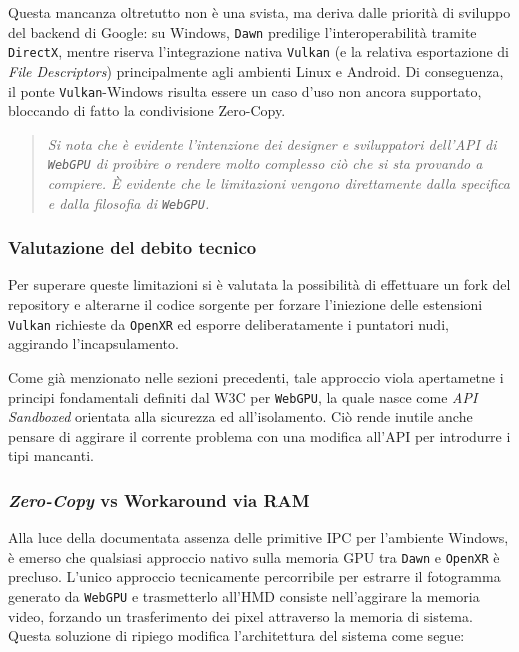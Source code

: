 \documentclass[a4paper, 11pt, twoside]{report}
\begin{document}
Questa mancanza oltretutto non è una svista, ma deriva dalle priorità di sviluppo del backend di Google:
su Windows, \texttt{Dawn} predilige l'interoperabilità tramite \texttt{\gls{DirectX}}, mentre riserva l'integrazione
nativa \texttt{\gls{Vulkan}} (e la relativa esportazione di \textit{File Descriptors}) principalmente agli ambienti
Linux e Android. Di conseguenza, il ponte \texttt{\gls{Vulkan}}-Windows risulta essere un caso d'uso non ancora
supportato, bloccando di fatto la condivisione Zero-Copy.

\begin{quote}
\itshape
Si nota che è evidente l'intenzione dei designer e sviluppatori dell'API di \texttt{WebGPU} di proibire o rendere molto
complesso ciò che si sta provando a compiere. È evidente che le limitazioni vengono direttamente dalla specifica e dalla
filosofia di \texttt{WebGPU}.
\end{quote}

\subsubsection{Valutazione del debito tecnico}

Per superare queste limitazioni si è valutata la possibilità di effettuare un fork del repository e alterarne il codice
sorgente per forzare l'iniezione delle estensioni \texttt{\gls{Vulkan}} richieste da \texttt{\gls{OpenXR}} ed esporre
deliberatamente i puntatori nudi, aggirando l'incapsulamento.

Come già menzionato nelle sezioni precedenti, tale approccio viola apertametne i principi fondamentali definiti dal W3C
per \texttt{WebGPU}, la quale nasce come \textit{API Sandboxed} orientata alla sicurezza ed all'isolamento.
Ciò rende inutile anche pensare di aggirare il corrente problema con una modifica all'API per introdurre i tipi mancanti.

\subsubsection{\textit{Zero-Copy} vs Workaround via RAM}

Alla luce della documentata assenza delle primitive IPC per l'ambiente Windows, è emerso che qualsiasi approccio nativo
sulla memoria GPU tra \texttt{Dawn} e \texttt{\gls{OpenXR}} è precluso. L'unico approccio tecnicamente percorribile per
estrarre il fotogramma generato da \texttt{WebGPU} e trasmetterlo all'HMD consiste nell'aggirare la memoria video,
forzando un trasferimento dei pixel attraverso la memoria di sistema.
Questa soluzione di ripiego modifica l'architettura del sistema come segue:
\end{document}
